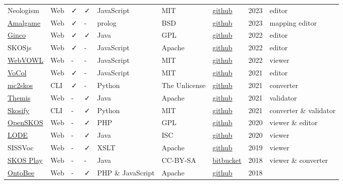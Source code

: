 \documentclass[
  DIV=10]{article}
\begin{document}
\begin{longtable}[]{@{}lllllllll@{}}
Neologism & Web & ✓ & ✓ & JavaScript & MIT &
\href{https://github.com/Semantic-Society/Neologism}{github} & 2023 &
editor \\
\href{https://semanticweb.cs.vu.nl/amalgame/}{Amalgame} & Web & ✓ & - &
prolog & BSD & \href{https://github.com/jrvosse/amalgame}{github} & 2023
& mapping editor \\
\href{http://culturecommunication.github.io/ginco/}{Ginco} & Web & ✓ & ✓
& Java & GPL &
\href{https://github.com/culturecommunication/ginco}{github} & 2022 &
editor \\
SKOSjs & Web & ✓ & - & JavaScript & Apache &
\href{https://github.com/tkurz/skosjs}{github} & 2022 & editor \\
\href{https://service.tib.eu/webvowl/}{WebVOWL} & Web & - & - &
JavaScript & MIT &
\href{https://github.com/VisualDataWeb/WebVOWL}{github} & 2022 &
viewer \\
\href{https://www.vocoreg.com/}{VoCol} & Web & ✓ & - & JavaScript & MIT
& \href{https://github.com/vocol/vocol}{github} & 2021 & editor \\
\href{https://github.com/scriptotek/mc2skos}{mc2skos} & CLI & ✓ & - &
Python & The Unlicense &
\href{https://github.com/scriptotek/mc2skos}{github} & 2021 &
converter \\
\href{http://themis.linkeddata.es/}{Themis} & Web & - & ✓ & Java &
Apache & \href{https://github.com/oeg-upm/Themis}{github} & 2021 &
validator \\
\href{https://skosify.readthedocs.io/en/latest/}{Skosify} & CLI & - & ✓
& Python & MIT & \href{https://github.com/NatLibFi/Skosify}{github} &
2021 & converter \& validator \\
\href{http://openskos.org/}{OpenSKOS} & Web & - & ✓ & PHP & GPL &
\href{https://github.com/OpenSKOS/OpenSKOS}{github} & 2020 & viewer \&
editor \\
\href{https://essepuntato.it/lode/}{LODE} & Web & - & ✓ & Java & ISC &
\href{https://github.com/essepuntato/LODE}{github} & 2020 & viewer \\
SISSVoc & Web & - & ✓ & XSLT & Apache &
\href{https://github.com/SISS/sissvoc}{github} & 2019 & viewer \\
\href{https://skos-play.sparna.fr/play/about}{SKOS Play} & Web & - & - &
Java & CC-BY-SA &
\href{https://bitbucket.org/tfrancart/sparna/src/master/}{bitbucket} &
2018 & viewer \& converter \\
\href{https://ontobee.org/}{OntoBee} & Web & - & ✓ & PHP \& JavaScript &
Apache & \href{https://github.com/OntoZoo/ontobee}{github} & 2018 &

\end{longtable}
\end{document}
